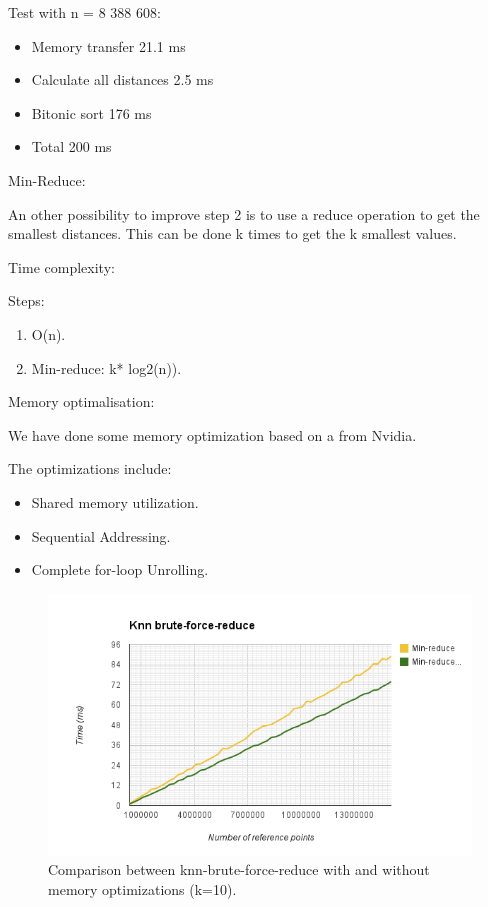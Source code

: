Test with n = 8 388 608:

\begin{itemize}
    \item Memory transfer 21.1 ms
    \item Calculate all distances 2.5 ms
    \item Bitonic sort 176 ms
    \item Total 200 ms
\end{itemize}

Min-Reduce:

An other possibility to improve step 2 is to use a reduce operation to get the smallest distances. This can be done k times to get the k smallest values.

Time complexity:

Steps:

\begin{enumerate}
    \item O(n).
    \item Min-reduce: k* log2(n)).
\end{enumerate}

Memory optimalisation:

We have done some memory optimization based on a
from Nvidia.

The optimizations include:

\begin{itemize}
    \item Shared memory utilization.
    \item Sequential Addressing.
    \item Complete for-loop Unrolling.
\end{itemize}

\begin{figure}[ht!]
\centering
\includegraphics[width=120mm]{../gfx/knn-brute-force-reduce-memory-opt.png}

\caption{Comparison between knn-brute-force-reduce with and without memory optimizations (k=10).}
\label{fig:knn_brute_force_reduce_memory_opt}
\end{figure}


